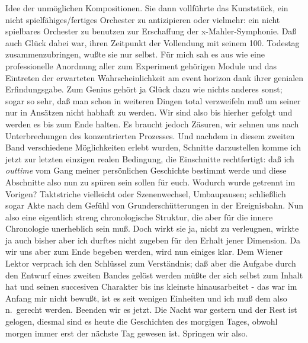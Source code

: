 \documentclass[
]{article}
\begin{document}
Idee der unmöglichen Kompositionen. Sie dann vollführte das Kunststück,
ein nicht spielfähiges/fertiges Orchester zu antizipieren oder vielmehr:
ein nicht spielbares Orchester zu benutzen zur Erschaffung der
x-Mahler-Symphonie. Daß auch Glück dabei war, ihren Zeitpunkt der
Vollendung mit seinem 100. Todestag zusammenzubringen, wußte sie nur
selbst. Für mich sah es aus wie eine professionelle Anordnung aller zum
Experiment gehörigen Module und das Eintreten der erwarteten
Wahrscheinlichkeit am event horizon dank ihrer genialen Erfindungsgabe.
Zum Genius gehört ja Glück dazu wie nichts anderes sonst; sogar so sehr,
daß man schon in weiteren Dingen total verzweifeln muß um seiner nur in
Ansätzen nicht habhaft zu werden. Wir sind also bis hierher gefolgt und
werden es bis zum Ende halten. Es braucht jedoch Zäsuren, wir sehnen uns
nach Unterbrechungen des konzentrierten Prozesses. Und nachdem in diesem
zweiten Band verschiedene Möglichkeiten erlebt wurden, Schnitte
darzustellen komme ich jetzt zur letzten einzigen realen Bedingung, die
Einschnitte rechtfertigt: daß ich \emph{outtime} vom Gang meiner
persönlichen Geschichte bestimmt werde und diese Abschnitte also nun zu
spüren sein sollen für euch. Wodurch wurde getrennt im Vorigen?
Taktstriche vielleicht oder Szenenwechsel, Umbaupausen; schließlich
sogar Akte nach dem Gefühl von Grunderschütterungen in der Ereignisbahn.
Nun also eine eigentlich streng chronologische Struktur, die aber für
die innere Chronologie unerheblich sein muß. Doch wirkt sie ja, nicht zu
verleugnen, wirkte ja auch bisher aber ich durftes nicht zugeben für den
Erhalt jener Dimension. Da wir uns aber zum Ende begeben werden, wird
nun einiges klar. Dem Wiener Lektor verprach ich den Schlüssel zum
Verständnis; daß aber die Aufgabe durch den Entwurf eines zweiten Bandes
gelöst werden müßte der sich selbst zum Inhalt hat und seinen succesiven
Charakter bis ins kleinste hinausarbeitet - das war im Anfang mir nicht
bewußt, ist es seit wenigen Einheiten und ich muß dem also n.~gerecht
werden. Beenden wir es jetzt. Die Nacht war gestern und der Rest ist
gelogen, diesmal sind es heute die Geschichten des morgigen Tages,
obwohl morgen immer erst der nächste Tag gewesen ist. Springen wir also.
\end{document}
